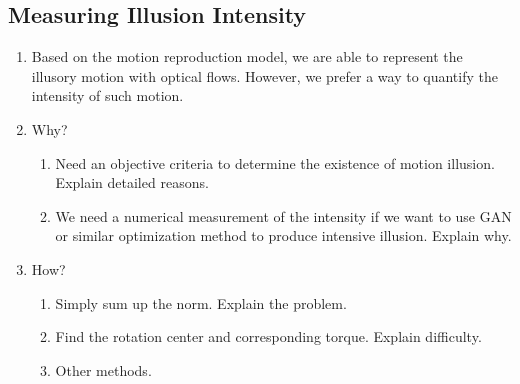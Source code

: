 \documentclass[journal]{IEEEtran}
\begin{document}
\subsection{Measuring Illusion Intensity}
\label{sec:detection_measure}
\begin{enumerate}
  \item Based on the motion reproduction model, we are able to represent the illusory motion with optical flows. However, we prefer a way to quantify the intensity of such motion.
  \item Why? \begin{enumerate}
    \item Need an objective criteria to determine the existence of motion illusion. Explain detailed reasons.
    \item We need a numerical measurement of the intensity if we want to use GAN or similar optimization method to produce intensive illusion. Explain why.
  \end{enumerate}
  \item How? \begin{enumerate}
    \item Simply sum up the norm. Explain the problem.
    \item Find the rotation center and corresponding torque. Explain difficulty.
    \item Other methods.
  \end{enumerate}
\end{enumerate}
\end{document}
